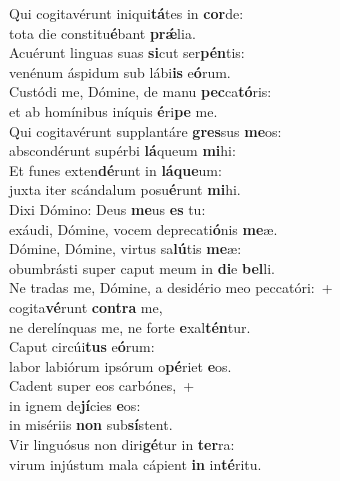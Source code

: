 \evenverse Qui cogitavérunt iniqui\textbf{tá}tes in \textbf{cor}de:~\*\\
\evenverse tota die constitu\textbf{é}bant \textbf{prǽ}lia.\\
\oddverse Acuérunt linguas suas \textbf{si}cut ser\textbf{pén}tis:~\*\\
\oddverse venénum áspidum sub lábi\textbf{is} e\textbf{ó}rum.\\
\evenverse Custódi me, Dómine, de manu \textbf{pec}ca\textbf{tó}ris:~\*\\
\evenverse et ab homínibus iníquis \textbf{é}ri\textbf{pe} me.\\
\oddverse Qui cogitavérunt supplantáre \textbf{gres}sus \textbf{me}os:~\*\\
\oddverse abscondérunt supérbi \textbf{lá}queum \textbf{mi}hi:\\
\evenverse Et funes exten\textbf{dé}runt in \textbf{lá}\textbf{que}um:~\*\\
\evenverse juxta iter scándalum posu\textbf{é}runt \textbf{mi}hi.\\
\oddverse Dixi Dómino: Deus \textbf{me}us \textbf{es} tu:~\*\\
\oddverse exáudi, Dómine, vocem deprecati\textbf{ó}nis \textbf{me}æ.\\
\evenverse Dómine, Dómine, virtus sa\textbf{lú}tis \textbf{me}æ:~\*\\
\evenverse obumbrásti super caput meum in \textbf{di}e \textbf{bel}li.\\
\oddverse Ne tradas me, Dómine, a desidério meo peccatóri:~+\\
\oddverse  cogita\textbf{vé}runt \textbf{con}\textbf{tra} me,~\*\\
\oddverse ne derelínquas me, ne forte \textbf{e}xal\textbf{tén}tur.\\
\evenverse Caput circúi\textbf{tus} e\textbf{ó}rum:~\*\\
\evenverse labor labiórum ipsórum o\textbf{pé}riet \textbf{e}os.\\
\oddverse Cadent super eos carbónes,~+\\
\oddverse  in ignem de\textbf{jí}cies \textbf{e}os:~\*\\
\oddverse in misériis \textbf{non} sub\textbf{sí}stent.\\
\evenverse Vir linguósus non diri\textbf{gé}tur in \textbf{ter}ra:~\*\\
\evenverse virum injústum mala cápient \textbf{in} in\textbf{té}ritu.\\
